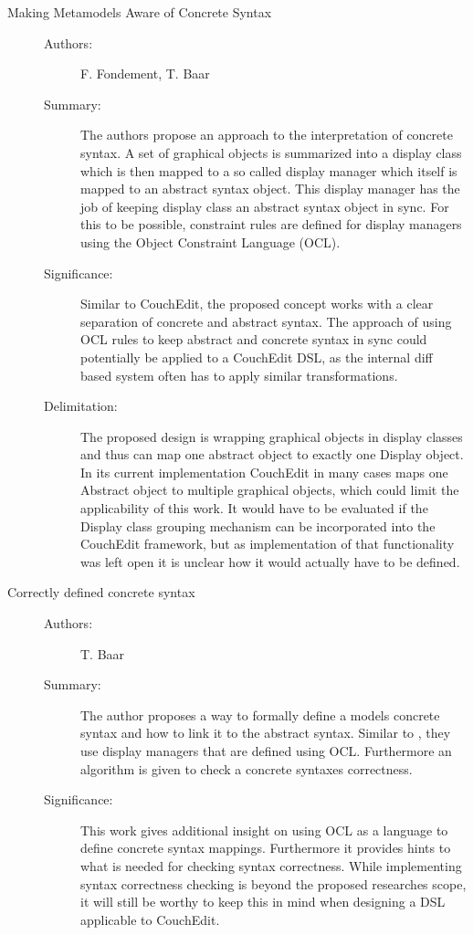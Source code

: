 \documentclass[10pt,a4paper,oneside]{scrartcl}
\begin{document}
\begin{description}
\begin{description}
        \end{description}

  \item[Making Metamodels Aware of Concrete Syntax] \cite{fondement_making_2005}
        \begin{description}
          \item[Authors:] F. Fondement, T. Baar
          \item[Summary:] The authors propose an approach to the interpretation of concrete syntax. A set of graphical objects is summarized into a display class which is then mapped to a so called display manager which itself is mapped to an abstract syntax object. This display manager has the job of keeping display class an abstract syntax object in sync. For this to be possible, constraint rules are defined for display managers using the Object Constraint Language (OCL).
          \item[Significance:] Similar to CouchEdit, the proposed concept works with a clear separation of concrete and abstract syntax. The approach of using OCL rules to keep abstract and concrete syntax in sync could potentially be applied to a CouchEdit DSL, as the internal diff based system often has to apply similar transformations.
          \item[Delimitation:] The proposed design is wrapping graphical objects in display classes and thus can map one abstract object to exactly one Display object. In its current implementation CouchEdit in many cases maps one Abstract object to multiple graphical objects, which could limit the applicability of this work. It would have to be evaluated if the Display class grouping mechanism can be incorporated into the CouchEdit framework, but as implementation of that functionality was left open it is unclear how it would actually have to be defined.
        \end{description}

  \item[Correctly defined concrete syntax] \cite{baar_correctly_2008}
        \begin{description}
          \item[Authors:] T. Baar
          \item[Summary:] The author proposes a way to formally define a models concrete syntax and how to link it to the abstract syntax. Similar to \cite{fondement_making_2005}, they use display managers that are defined using OCL. Furthermore an algorithm is given to check a concrete syntaxes correctness.
          \item[Significance:] This work gives additional insight on using OCL as a language to define concrete syntax mappings. Furthermore it provides hints to what is needed for checking syntax correctness. While implementing syntax correctness checking is beyond the proposed researches scope, it will still be worthy to keep this in mind when designing a DSL applicable to CouchEdit.
        \end{description}


\end{description}
\end{document}
